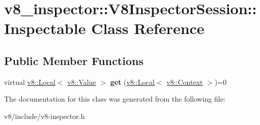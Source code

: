 \hypertarget{classv8__inspector_1_1V8InspectorSession_1_1Inspectable}{}\section{v8\+\_\+inspector\+:\+:V8\+Inspector\+Session\+:\+:Inspectable Class Reference}
\label{classv8__inspector_1_1V8InspectorSession_1_1Inspectable}
\subsection*{Public Member Functions}
\begin{DoxyCompactItemize}
\item 
\mbox{\label{classv8__inspector_1_1V8InspectorSession_1_1Inspectable_ad7811abdabae6f826f98150f621cee63}} 
virtual \mbox{\hyperlink{classv8_1_1Local}{v8\+::\+Local}}$<$ \mbox{\hyperlink{classv8_1_1Value}{v8\+::\+Value}} $>$ {\bfseries get} (\mbox{\hyperlink{classv8_1_1Local}{v8\+::\+Local}}$<$ \mbox{\hyperlink{classv8_1_1Context}{v8\+::\+Context}} $>$)=0
\end{DoxyCompactItemize}


The documentation for this class was generated from the following file\+:\begin{DoxyCompactItemize}
\item 
v8/include/v8-\/inspector.\+h\end{DoxyCompactItemize}
